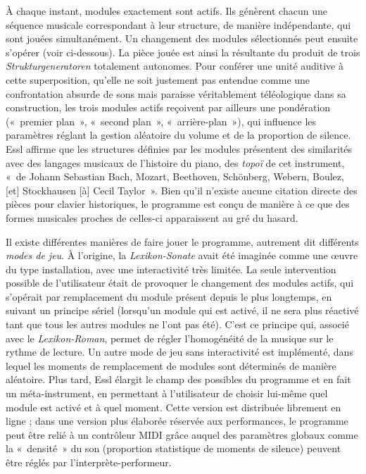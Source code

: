 \documentclass[a4paper,12pt]{article}
\newcommand{\guill}[1]{«~#1~»}
\begin{document}
À chaque instant, modules exactement sont actifs. Ils génèrent chacun une séquence musicale correspondant à leur structure, de manière indépendante, qui sont jouées simultanément. Un changement des modules sélectionnés peut ensuite s'opérer (voir ci-dessous). La pièce jouée est ainsi la résultante du produit de trois \emph{Strukturgeneratoren} totalement autonomes. Pour conférer une unité auditive à cette superposition, qu'elle ne soit justement pas entendue comme une confrontation absurde de sons mais paraisse véritablement téléologique dans sa construction, les trois modules actifs reçoivent par ailleurs une pondération (\guill{premier plan}, \guill{second plan}, \guill{arrière-plan}), qui influence les paramètres réglant la gestion aléatoire du volume et de la proportion de silence. Essl affirme que les structures définies par les modules présentent des similarités avec des langages musicaux de l'histoire du piano, des \emph{topo\"i} de cet instrument, \guill{de Johann Sebastian Bach, Mozart, Beethoven, Schönberg, Webern, Boulez, [et] Stockhausen [à] Cecil Taylor}. Bien qu'il n'existe aucune citation directe des pièces pour clavier historiques, le programme est conçu de manière à ce que des formes musicales proches de celles-ci apparaissent au gré du hasard.

Il existe différentes manières de faire jouer le programme, autrement dit différents \emph{modes de jeu}. À l'origine, la \emph{Lexikon-Sonate} avait été imaginée comme une œuvre du type installation, avec une interactivité très limitée. La seule intervention possible de l'utilisateur était de provoquer le changement des modules actifs, qui s'opérait par remplacement du module présent depuis le plus longtemps, en suivant un principe sériel (lorsqu'un module qui est activé, il ne sera plus réactivé tant que tous les autres modules ne l'ont pas été). C'est ce principe qui, associé avec le \emph{Lexikon-Roman}, permet de régler l'homogénéité de la musique sur le rythme de lecture. Un autre mode de jeu sans interactivité est implémenté, dans lequel les moments de remplacement de modules sont déterminés de manière aléatoire. Plus tard, Essl élargit le champ des possibles du programme et en fait un méta-instrument, en permettant à l'utilisateur de choisir lui-même quel module est activé et à quel moment. Cette version est distribuée librement en ligne ; dans une version plus élaborée réservée aux performances, le programme peut être relié à un contrôleur MIDI grâce auquel des paramètres globaux comme la \guill{densité} du son (proportion statistique de moments de silence) peuvent être réglés par l'interprète-performeur.
\end{document}
